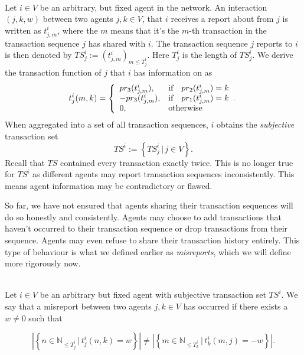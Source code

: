 \begin{definition}\ \\
\label{def:Agent Information}
Let $i\in{}V$ be an arbitrary, but fixed agent in the network. An interaction $(j,k,w)$ between two agents $j,k\in{}V$, that $i$ receives a report about from $j$ is written as $t_{j,m}^i$, where the $m$ means that it's the $m$-th transaction in the transaction sequence $j$ has shared with $i$. The transaction sequence $j$ reports to $i$ is then denoted by $TS_j^i:=(t_{j,m}^i)_{m\leq{}T_j^i}$. Here $T_j^i$ is the length of $TS_j^i$. We derive the transaction function of $j$ that $i$ has information on as 
\[
t_j^i(m,k)=\left\lbrace 
\begin{array}{lll}
pr_3(t_{j,m}^i), & \textrm{if} & pr_2(t_{j,m}^i)=k \\
-pr_3(t_{j,m}^i), & \textrm{if} & pr_1(t_{j,m}^i)=k \\
0, & \multicolumn{2}{l}{\textrm{otherwise}} \\
\end{array}.
\right. \vspace{1em}\\
\]
\noindent{}When aggregated into a set of all transaction sequences, $i$ obtains the {\it subjective} transaction set 
\[
TS^i:=\left\lbrace{}TS_j^i\,|\,j\in{}V\right\rbrace.
\]
\noindent{}Recall that $TS$ contained every transaction exactly twice. This is no longer true for $TS^i$ as different agents may report transaction sequences inconsistently. This means agent information may be contradictory or flawed. \vspace{1em}\\
\end{definition}

\noindent{}So far, we have not ensured that agents sharing their transaction sequences will do so honestly and consistently. Agents may choose to add transactions that haven't occurred to their transaction sequence or drop transactions from their sequence. Agents may even refuse to share their transaction history entirely. This type of behaviour is what we defined earlier as {\it misreports}, which we will define more rigorously now. \vspace{1em}\\

\begin{definition}\ \\
\label{def:Misreport Attack}
Let $i\in{}V$ be an arbitrary but fixed agent with subjective transaction set $TS^i$. We say that a misreport between two agents $j,k\in{}V$ has occurred if there exists a $w\neq{}0$ such that 

\[
\left|\left\lbrace{}n\in\mathbb{N}_{\leq{}T_j^i}\,|\,t_j^i(n,k)=w\right\rbrace\right| \neq \left|\left\lbrace{}m\in\mathbb{N}_{\leq{}T_k^i}\,|\,t_k^i(m,j)=-w\right\rbrace\right|.
\]
\end{definition} 

